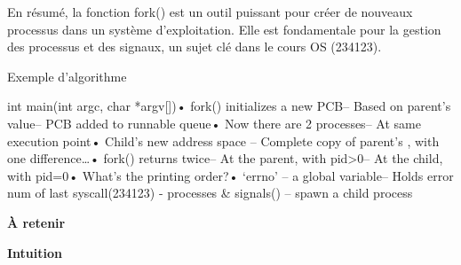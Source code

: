 \documentclass[12pt]{article}
\begin{document}
En résumé, la fonction fork() est un outil puissant pour créer de nouveaux processus dans un système d'exploitation. Elle est fondamentale pour la gestion des processus et des signaux, un sujet clé dans le cours OS (234123).
\begin{algorithm}[H]
\caption{Exemple d'algorithme}
\begin{algorithmic}
    \STATE int main(int argc, char *argv[])\newline• fork() initializes a new PCB\newline– Based on parent’s value\newline– PCB added to runnable queue\newline• Now there are 2 processes\newline– At same execution point\newline• Child’s new address space \newline– Complete copy of parent’s \newlinespace, with one difference…\newline• fork() returns twice\newline– At the parent, with pid>0\newline– At the child, with pid=0\newline• What’s the printing order?\newline• ‘errno’ – a global variable\newline– Holds error num of last syscall\newlineOS (234123) - processes \& signals\newlinefork() – spawn a child process
\end{algorithmic}
\end{algorithm}
\begin{tcolorbox}[colback=yellow!5, colframe=yellow!80!black, sharp corners, boxrule=0.8mm]
\textbf{À retenir}
\end{tcolorbox}
\begin{tcolorbox}[colback=green!5, colframe=green!80!black, sharp corners, boxrule=0.8mm]
\textbf{Intuition}
\end{tcolorbox}
\end{document}

